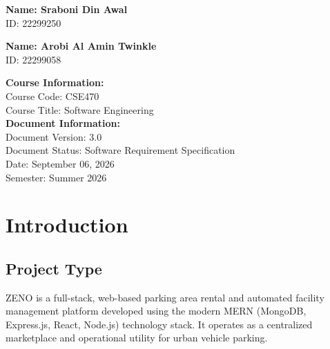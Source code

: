 \documentclass[12pt,a4paper]{article}
\begin{document}
\begin{titlepage}
\begin{center}
\begin{flushleft}
        \vspace{0.2cm}

        \begin{minipage}{0.49\textwidth}
            \textbf{Name: Sraboni Din Awal}\\
            ID: 22299250
        \end{minipage}
        \hfill
        \begin{minipage}{0.49\textwidth}
            \textbf{Name: Arobi Al Amin Twinkle}\\
            ID: 22299058
        \end{minipage}

        \vspace{0.4cm}

        \textbf{Course Information:}\\[0.1cm]
        Course Code: CSE470\\
        Course Title: Software Engineering\\[0.3cm]

        \textbf{Document Information:}\\[0.1cm]
        Document Version: 3.0\\
        Document Status: Software Requirement Specification\\[0.3cm]

        Date: September 06, 2026\\
        Semester: Summer 2026
        \end{flushleft}

        \vfill
    \end{center}
\end{titlepage}

\newpage
{}
{
  \setlength{\parskip}{0pt}
  \tableofcontents
}
\newpage
{}

\section{Introduction}

\subsection{Project Type}
ZENO is a full-stack, web-based parking area rental and automated facility management platform developed using the modern MERN (MongoDB, Express.js, React, Node.js) technology stack. It operates as a centralized marketplace and operational utility for urban vehicle parking.
\end{document}
